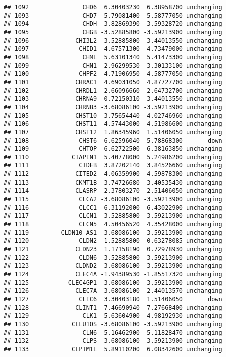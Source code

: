 \documentclass[]{article}
\begin{document}
\begin{verbatim}
## 1092               CHD6  6.30403230  6.38958700 unchanging
## 1093               CHD7  5.79081400  5.58777050 unchanging
## 1094               CHDH  3.82869390  3.59328720 unchanging
## 1095               CHGB -3.52885800 -3.59213900 unchanging
## 1096             CHI3L2 -3.52885800 -3.44013550 unchanging
## 1097              CHID1  4.67571300  4.73479000 unchanging
## 1098               CHML  5.63101340  5.41473300 unchanging
## 1099               CHN1  2.96299530  3.30133100 unchanging
## 1100              CHPF2  4.71906950  4.58777050 unchanging
## 1101             CHRAC1  4.69031050  4.87727700 unchanging
## 1102             CHRDL1  2.66096660  2.64732700 unchanging
## 1103             CHRNA9 -0.72150310 -3.44013550 unchanging
## 1104             CHRNB3 -3.68086100 -3.59213900 unchanging
## 1105             CHST10  3.75654440  4.02746960 unchanging
## 1106             CHST11  4.57443000  4.51986600 unchanging
## 1107             CHST12  1.86345960  1.51406050 unchanging
## 1108              CHST6  6.62596040  5.78868300       down
## 1109              CHTOP  6.62722500  6.38163850 unchanging
## 1110            CIAPIN1  5.40778000  5.24986200 unchanging
## 1111              CIDEB  3.87202140  3.84526660 unchanging
## 1112             CITED2  4.06359900  4.59878300 unchanging
## 1113             CKMT1B  3.74726680  3.40535430 unchanging
## 1114             CLASRP  2.37803270  2.51406050 unchanging
## 1115              CLCA2 -3.68086100 -3.59213900 unchanging
## 1116              CLCC1  6.31192000  6.43022900 unchanging
## 1117              CLCN1 -3.52885800 -3.59213900 unchanging
## 1118              CLCN5  4.50456520  4.35428000 unchanging
## 1119         CLDN10-AS1 -3.68086100 -3.59213900 unchanging
## 1120              CLDN2 -1.52885800 -0.63278085 unchanging
## 1121             CLDN23  1.17158190  0.72978930 unchanging
## 1122              CLDN6 -3.52885800 -3.59213900 unchanging
## 1123             CLDND2 -3.68086100 -3.59213900 unchanging
## 1124             CLEC4A -1.94389530 -1.85517320 unchanging
## 1125           CLEC4GP1 -3.68086100 -3.59213900 unchanging
## 1126             CLEC7A -3.68086100 -2.44013570 unchanging
## 1127              CLIC6  3.30403180  1.51406050       down
## 1128             CLINT1  7.46690940  7.27668400 unchanging
## 1129               CLK1  5.63604900  4.98192930 unchanging
## 1130            CLLU1OS -3.68086100 -3.59213900 unchanging
## 1131               CLN6  5.16462900  5.11828470 unchanging
## 1132               CLPS -3.68086100 -3.59213900 unchanging
## 1133            CLPTM1L  5.89110200  6.08342600 unchanging

\end{verbatim}
\end{document}

